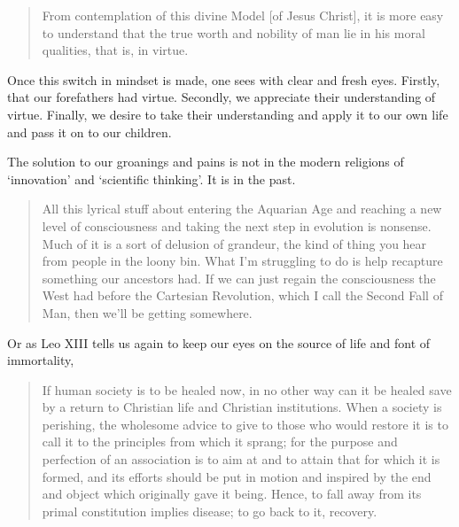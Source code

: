 \documentclass[letterpaper]{article}
\begin{document}
\begin{quote}
  From contemplation of this divine Model [of Jesus Christ], it is more easy to understand that the true worth and nobility of man lie in his moral qualities, that is, in virtue.
\end{quote}

Once this switch in mindset is made, one sees with clear and fresh eyes. Firstly, that our forefathers had virtue. Secondly, we appreciate their understanding of virtue. Finally, we desire to take their understanding and apply it to our own life and pass it on to our children.

The solution to our groanings and pains is not in the modern religions of `innovation' and `scientific thinking'. It is in the past.

\begin{quote}
  All this lyrical stuff about entering the Aquarian Age and reaching a new level of consciousness and taking the next step in evolution is nonsense. Much of it is a sort of delusion of grandeur, the kind of thing you hear from people in the loony bin. What I'm struggling to do is help recapture something our ancestors had. If we can just regain the consciousness the West had before the Cartesian Revolution, which I call the Second Fall of Man, then we'll be getting somewhere.

\end{quote}

Or as Leo XIII tells us again to keep our eyes on the source of life and font of immortality,

\begin{quote}
  If human society is to be healed now, in no other way can it be healed save by a return to Christian life and Christian institutions. When a society is perishing, the wholesome advice to give to those who would restore it is to call it to the principles from which it sprang; for the purpose and perfection of an association is to aim at and to attain that for which it is formed, and its efforts should be put in motion and inspired by the end and object which originally gave it being. Hence, to fall away from its primal constitution implies disease; to go back to it, recovery.
\end{quote}
\end{document}
